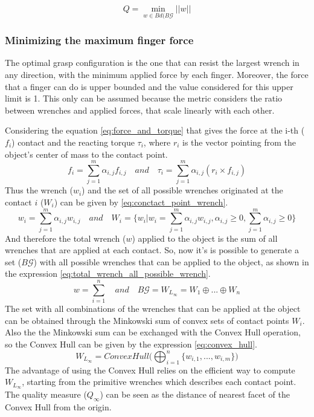 \begin{equation}\label{eq:Q_lasgest_radius}
    Q= \min_{w \in Bd(B\mathcal{G}} ||w||
\end{equation}

\subsubsection{Minimizing the maximum finger force}
The optimal grasp configuration is the one that can resist the largest wrench in any direction, with the minimum applied force by each finger. Moreover, the force that a finger can do is upper bounded and the value considered for this upper limit is 1. This only can be assumed because the metric considers the ratio between wrenches and applied forces, that scale linearly with each other.

Considering the equation \eqref{eq:force_and_torque} that gives the force at the i-th ($f_i$) contact and the reacting torque $\tau_i$, where $r_i$ is the vector pointing from the object's center of mass to the contact point.
\begin{equation}\label{eq:force_and_torque}
     f_i= \sum_{j=1}^{m}\alpha_{i,j}f_{i,j} \quad and \quad  \tau_i= \sum_{j=1}^{m}\alpha_{i,j}( r_i \times f_{i,j} )
\end{equation}
Thus the wrench ($w_i$) and the set of all possible wrenches originated at the contact $i$ ($W_i$) can be given by \eqref{eq:conctact_point_wrench}.
\begin{equation}\label{eq:conctact_point_wrench}
    w_i= \sum_{j=1}^{m}\alpha_{i,j}w_{i,j} \quad and \quad 
    W_i=\bigg\{w_i | w_i=\sum_{j=1}^{m}\alpha_{i,j}w_{i,j}, \alpha_{i,j}\ge 0, \sum_{j=1}^{m}\alpha_{i,j}\ge 0 \bigg\}
\end{equation}
And therefore the total wrench ($w$) applied to the object is the sum of all wrenches that are applied at each contact. So, now it's is possible to generate a set ($B\mathcal{G}$) with all possible wrenches that can be applied to the object, as shown in the expression \eqref{eq:total_wrench_all_possible_wrench}.
\begin{equation}\label{eq:total_wrench_all_possible_wrench}
    w=\sum_{i=1}^n \quad and \quad
       B\mathcal{G}=W_{L_{\infty}}=W_1 \oplus ... \oplus W_n
\end{equation}
The set with all combinations of the wrenches that can be applied at the object can be obtained through the Minkowski sum of convex sets of contact points $W_i$.
Also the the Minkowski sum can be exchanged with the Convex Hull operation, so the Convex Hull can be given by the expression \eqref{eq:convex_hull}.
\begin{equation}\label{eq:convex_hull}
    W_{L_{\infty}}= Convex Hull\Bigg(\bigoplus_{i=1}^{n} \{ w_{i,1}, ..., w_{i,m} \} \Bigg)
\end{equation}
The advantage of using the Convex Hull relies on the efficient way to compute $W_{L_{\infty}}$, starting from the primitive wrenches which describes each contact point.
The quality measure ($Q_{\infty}$) can be seen as the distance of nearest facet of the Convex Hull from the origin.

